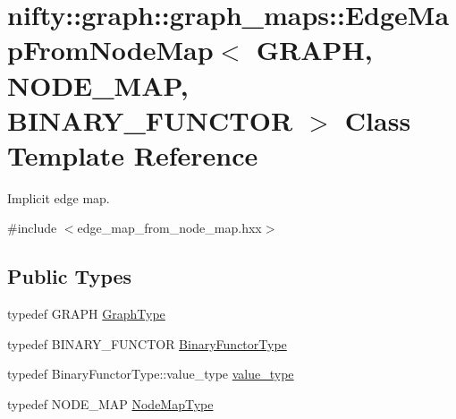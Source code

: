 \hypertarget{classnifty_1_1graph_1_1graph__maps_1_1EdgeMapFromNodeMap}{}\section{nifty\+:\+:graph\+:\+:graph\+\_\+maps\+:\+:Edge\+Map\+From\+Node\+Map$<$ G\+R\+A\+PH, N\+O\+D\+E\+\_\+\+M\+AP, B\+I\+N\+A\+R\+Y\+\_\+\+F\+U\+N\+C\+T\+OR $>$ Class Template Reference}
\label{classnifty_1_1graph_1_1graph__maps_1_1EdgeMapFromNodeMap}


Implicit edge map.  




{\ttfamily \#include $<$edge\+\_\+map\+\_\+from\+\_\+node\+\_\+map.\+hxx$>$}

\subsection*{Public Types}
\begin{DoxyCompactItemize}
\item 
typedef G\+R\+A\+PH \hyperlink{classnifty_1_1graph_1_1graph__maps_1_1EdgeMapFromNodeMap_a551dfc3ef2c5293f5306420d129da574}{Graph\+Type}
\item 
typedef B\+I\+N\+A\+R\+Y\+\_\+\+F\+U\+N\+C\+T\+OR \hyperlink{classnifty_1_1graph_1_1graph__maps_1_1EdgeMapFromNodeMap_a0fbb6e9a54ecf31d27e13db4f274a6d1}{Binary\+Functor\+Type}
\item 
typedef Binary\+Functor\+Type\+::value\+\_\+type \hyperlink{classnifty_1_1graph_1_1graph__maps_1_1EdgeMapFromNodeMap_abc24027c855755008ba3694cc49999c2}{value\+\_\+type}
\item 
typedef N\+O\+D\+E\+\_\+\+M\+AP \hyperlink{classnifty_1_1graph_1_1graph__maps_1_1EdgeMapFromNodeMap_ad2639421843e9da9afe18b0b35a7317e}{Node\+Map\+Type}
\end{DoxyCompactItemize}

